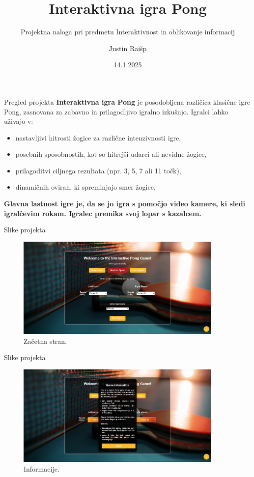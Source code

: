 \documentclass{beamer}
\title{Interaktivna igra Pong}
\subtitle{Projektna naloga pri predmetu Interaktivnost in oblikovanje informacij}
\author{Justin Raišp}
\date{14.1.2025}
\begin{document}
\begin{frame}
    \titlepage
\end{frame}

\begin{frame}{Pregled projekta}
    \textbf{Interaktivna igra Pong} je posodobljena različica klasične igre Pong, zasnovana za zabavno in prilagodljivo igralno izkušnjo. Igralci lahko uživajo v:
    \begin{itemize}
        \item nastavljivi hitrosti žogice za različne intenzivnosti igre,
        \item posebnih sposobnostih, kot so hitrejši udarci ali nevidne žogice,
        \item prilagoditvi ciljnega rezultata (npr. 3, 5, 7 ali 11 točk),
        \item dinamičnih ovirah, ki spreminjajo smer žogice.
    \end{itemize}
    \textbf{Glavna lastnost igre je, da se jo igra s pomočjo video kamere, ki sledi igralčevim rokam. Igralec premika svoj lopar s kazalcem.}
\end{frame}

\begin{frame}{Slike projekta}
  \begin{figure}
      \centering
      \includegraphics[width=0.9\textwidth]{images/homePage.png}
      \caption{Začetna stran.}
      \label{fig:interface}
  \end{figure}
\end{frame}

\begin{frame}{Slike projekta}
  \begin{figure}
      \centering
      \includegraphics[width=0.9\textwidth]{images/info.png}
      \caption{Informacije.}
      \label{fig:interface}
  \end{figure}
\end{frame}
\end{document}
